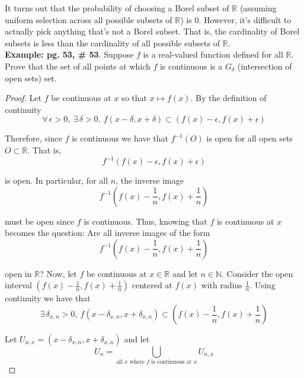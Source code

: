 \documentclass[12pt]{article}
\newlength\tindent
\renewcommand{\indent}{\hspace*{\tindent}}
\newcommand{\R}{\mathbb R}
\newcommand{\N}{\mathbb N}
\begin{document}
\indent It turns out that the probability of choosing a Borel subset of $\R$ (assuming uniform selection across all possible subsets of $\R$) is 0. However, it's difficult to actually pick anything that's not a Borel subset. That is, the cardinality of Borel subsets is less than the cardinality of all possible subsets of $\R$. \\

{\bf Example: pg. 53, \# 53}. Suppose $f$ is a real-valued function defined for all $\R$. Prove that the set of all points at which $f$ is continuous is a $G_\delta$ (intersection of open sets) set. \\

\begin{proof} Let $f$ be continuous at $x$ so that $x\mapsto f(x)$. By the definition of continuity
\begin{equation*}
	\forall\,\epsilon > 0,~\exists\,\delta > 0,~f(x - \delta, x + \delta) \subset (f(x) - \epsilon, f(x) + \epsilon)
\end{equation*}

Therefore, since $f$ is continuous we have that $f^{-1}(O)$ is open for all open sets $O \subset \R$. That is,
\begin{equation*}
	f^{-1}(f(x) - \epsilon, f(x) + \epsilon)
\end{equation*}

is open. In particular, for all $n$, the inverse image
\begin{equation*}
	f^{-1} \left(f(x) - \frac{1}{n}, f(x) + \frac{1}{n} \right)
\end{equation*}

must be open since $f$ is continuous. Thus, knowing that $f$ is continuous at $x$ becomes the question: Are all inverse images of the form
\begin{equation*}
	f^{-1} \left(f(x) - \frac{1}{n}, f(x) + \frac{1}{n} \right)
\end{equation*}

open in $\R$? Now, let $f$ be continuous at $x \in \R$ and let $n \in \N$. Consider the open interval $\left( f(x) - \frac{1}{n}, f(x) + \frac{1}{n} \right)$ centered at $f(x)$ with radius $\frac{1}{n}$. Using continuity we have that
\begin{equation*}
	\exists\,\delta_{x,n} > 0,~ f(x - \delta_{x,n}, x + \delta_{x,n}) \subset \left(f(x) - \frac{1}{n}, f(x) + \frac{1}{n} \right)
\end{equation*}

Let $U_{n,x} = (x - \delta_{x,n}, x + \delta_{x,n})$ and let
\begin{equation*}
	U_n = \bigcup_{\text{all $x$ where $f$ is continuous at $x$}} U_{n,x}
\end{equation*}


\end{proof}
\end{document}
